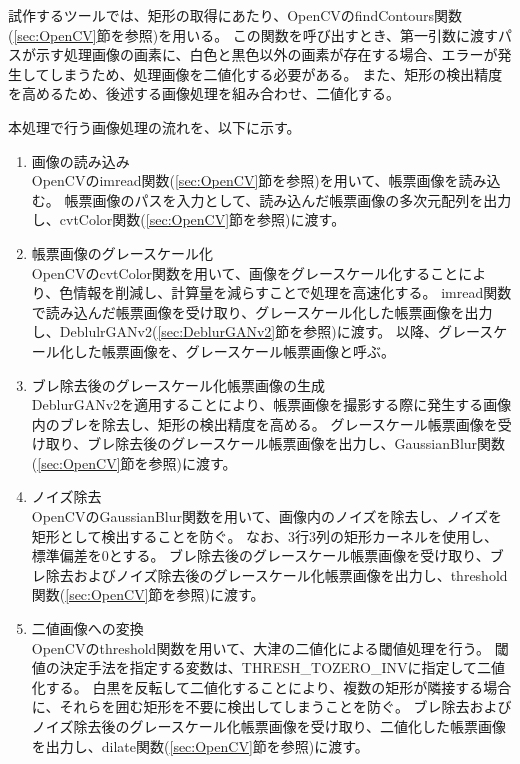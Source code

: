 試作するツールでは、矩形の取得にあたり、OpenCVのfindContours関数(\ref{sec:OpenCV}節を参照)を用いる。
この関数を呼び出すとき、第一引数に渡すパスが示す処理画像の画素に、白色と黒色以外の画素が存在する場合、エラーが発生してしまうため、処理画像を二値化する必要がある。
また、矩形の検出精度を高めるため、後述する画像処理を組み合わせ、二値化する。

本処理で行う画像処理の流れを、以下に示す。

\begin{enumerate}
    \item 画像の読み込み\\
        OpenCVのimread関数(\ref{sec:OpenCV}節を参照)を用いて、帳票画像を読み込む。
        帳票画像のパスを入力として、読み込んだ帳票画像の多次元配列を出力し、cvtColor関数(\ref{sec:OpenCV}節を参照)に渡す。
    \item 帳票画像のグレースケール化\\
        OpenCVのcvtColor関数を用いて、画像をグレースケール化することにより、色情報を削減し、計算量を減らすことで処理を高速化する。
        imread関数で読み込んだ帳票画像を受け取り、グレースケール化した帳票画像を出力し、DeblulrGANv2(\ref{sec:DeblurGANv2}節を参照)に渡す。
        以降、グレースケール化した帳票画像を、グレースケール帳票画像と呼ぶ。
    \item ブレ除去後のグレースケール化帳票画像の生成\\
        DeblurGANv2を適用することにより、帳票画像を撮影する際に発生する画像内のブレを除去し、矩形の検出精度を高める。
        グレースケール帳票画像を受け取り、ブレ除去後のグレースケール帳票画像を出力し、GaussianBlur関数(\ref{sec:OpenCV}節を参照)に渡す。
    \item ノイズ除去\\
        OpenCVのGaussianBlur関数を用いて、画像内のノイズを除去し、ノイズを矩形として検出することを防ぐ。
        なお、3行3列の矩形カーネルを使用し、標準偏差を0とする。
        ブレ除去後のグレースケール帳票画像を受け取り、ブレ除去およびノイズ除去後のグレースケール化帳票画像を出力し、threshold関数(\ref{sec:OpenCV}節を参照)に渡す。
    \item 二値画像への変換\\
        OpenCVのthreshold関数を用いて、大津の二値化による閾値処理を行う。
        閾値の決定手法を指定する変数は、THRESH\_TOZERO\_INVに指定して二値化する。
        白黒を反転して二値化することにより、複数の矩形が隣接する場合に、それらを囲む矩形を不要に検出してしまうことを防ぐ。
        ブレ除去およびノイズ除去後のグレースケール化帳票画像を受け取り、二値化した帳票画像を出力し、dilate関数(\ref{sec:OpenCV}節を参照)に渡す。

\end{enumerate}
